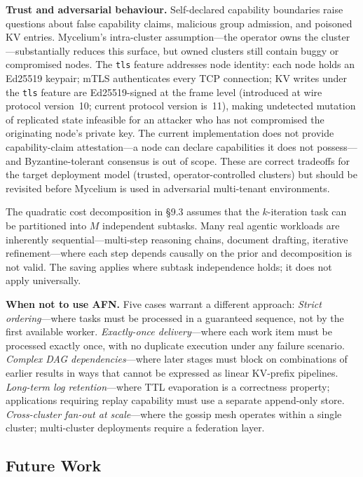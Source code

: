 \documentclass[11pt]{article}
\begin{document}
\textbf{Trust and adversarial behaviour.} Self-declared capability boundaries
raise questions about false capability claims, malicious group admission, and
poisoned KV entries. Mycelium's intra-cluster assumption---the operator owns the
cluster---substantially reduces this surface, but owned clusters still contain
buggy or compromised nodes. The \texttt{tls} feature addresses node identity:
each node holds an Ed25519 keypair; mTLS authenticates every TCP connection;
KV writes under the \texttt{tls} feature are Ed25519-signed at the frame level
(introduced at wire protocol version~10; current protocol version is~11),
making undetected mutation of replicated state infeasible for
an attacker who has not compromised the originating node's private key. The
current implementation does not provide capability-claim attestation---a node
can declare capabilities it does not possess---and Byzantine-tolerant consensus
is out of scope. These are correct tradeoffs for the target deployment model
(trusted, operator-controlled clusters) but should be revisited before Mycelium
is used in adversarial multi-tenant environments.

The quadratic cost decomposition in \S9.3 assumes that the $k$-iteration task
can be partitioned into $M$ independent subtasks. Many real agentic workloads
are inherently sequential---multi-step reasoning chains, document drafting,
iterative refinement---where each step depends causally on the prior and
decomposition is not valid. The saving applies where subtask independence holds;
it does not apply universally.

\textbf{When not to use AFN.} Five cases warrant a different approach:
\emph{Strict ordering}---where tasks must be processed in a guaranteed sequence,
not by the first available worker.
\emph{Exactly-once delivery}---where each work item must be processed exactly
once, with no duplicate execution under any failure scenario.
\emph{Complex DAG dependencies}---where later stages must block on combinations
of earlier results in ways that cannot be expressed as linear KV-prefix pipelines.
\emph{Long-term log retention}---where TTL evaporation is a correctness property;
applications requiring replay capability must use a separate append-only store.
\emph{Cross-cluster fan-out at scale}---where the gossip mesh operates within a
single cluster; multi-cluster deployments require a federation layer.

\subsection{Future Work}
\end{document}
